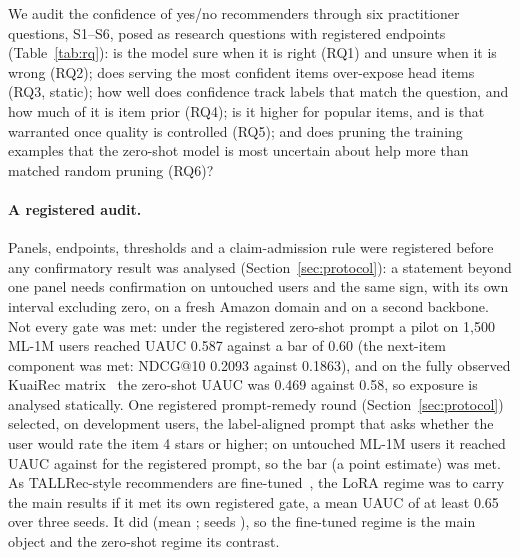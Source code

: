 We audit the confidence of yes/no recommenders through six practitioner questions, S1--S6, posed as research questions with
registered endpoints (Table~\ref{tab:rq}): is the model sure when it is right (RQ1) and unsure when it is wrong (RQ2); does
serving the most confident items over-expose head items (RQ3, static); how well does confidence track labels that match the
question, and how much of it is item prior (RQ4); is it higher for popular items, and is that warranted once quality is
controlled (RQ5); and does pruning the training examples that the zero-shot model is most uncertain about help more than matched
random pruning (RQ6)?

\paragraph{A registered audit.}
Panels, endpoints, thresholds and a claim-admission rule were registered before any confirmatory result was analysed
(Section~\ref{sec:protocol}): a statement beyond one panel needs confirmation on untouched users and the same sign, with its own
interval excluding zero, on a fresh Amazon domain and on a second backbone. Not every gate was met: under the registered zero-shot
prompt a pilot on 1,500 ML-1M users reached UAUC 0.587 against a bar of 0.60 (the next-item component was met: NDCG@10 0.2093
against 0.1863), and on the fully observed KuaiRec matrix~\citep{gao2022kuairec} the zero-shot UAUC was 0.469 against 0.58, so
exposure is analysed statically. One registered prompt-remedy round (Section~\ref{sec:protocol}) selected, on development users,
the label-aligned prompt that asks whether the user would rate the item 4 stars or higher; on 
untouched ML-1M users it reached UAUC  against  for the registered
prompt, so the bar (a point estimate) was met. As TALLRec-style recommenders are fine-tuned~\citep{bao2023tallrec}, the LoRA regime
was to carry the main results if it met its own registered gate, a mean UAUC of at least 0.65 over three seeds. It did (mean
; seeds ), so the fine-tuned regime is the
main object and the zero-shot regime its contrast.

